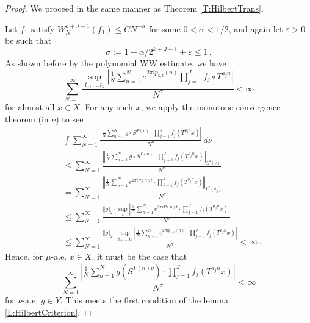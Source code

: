 \documentclass[11pt, oneside]{amsart}   	%
\newcommand{\ep}{\varepsilon}
\newcommand{\1}{\mathbbm{1}}
\theoremstyle{definition}
\begin{document}
\begin{proof}
We proceed in the same manner as Theorem \ref{T:HilbertTrans}.

Let $f_1$ satisfy $W^{k+J-1}_N(f_1) \leq CN^{-\alpha}$ for some $0<\alpha<1/2$, and again let $\ep > 0$ be such that 
$$\sigma := 1- \alpha/2^{k+J-1} + \ep \leq 1 \, .$$ 
As shown before by the polynomial WW estimate, we have 
$$\sum_{N=1}^\infty \frac{\sup_{t_1, \dots, t_k}\left|\frac{1}{N}\sum_{n=1}^N e^{2\pi i p_{k, t}(n)} \prod_{j=1}^{J} f_j \circ T^{a_j n}\right|}{N^\sigma} < \infty$$ for almost all $x\in X$. For any such $x$, we apply the monotone convergence theorem (in $\nu$) to see
\begin{align*}
&\int \sum_{N=1}^\infty \frac{\left| \frac{1}{N} \sum_{n=1}^N g \circ S^{P(n)} \cdot \prod_{j=1}^J f_j (T^{a_jn} x)\right|}{N^\sigma} \, d\nu \\
&\leq  \sum_{N=1}^\infty \frac{\left\Vert \frac{1}{N} \sum_{n=1}^N g \circ S^{P(n)} \cdot \prod_{j=1}^J f_j (T^{a_jn} x)\right\Vert_{L^2(\nu)}}{N^\sigma} \\
&= \sum_{N=1}^\infty \frac{\left\Vert \frac{1}{N} \sum_{n=1}^N e^{2\pi i P(n) t} \cdot \prod_{j=1}^J f_j (T^{a_jn} x)\right\Vert_{L^2(\sigma_g)}}{N^\sigma}  \\
&\leq \sum_{N=1}^\infty \frac{\Vert g\Vert_2 \cdot \sup_{t}\left| \frac{1}{N} \sum_{n=1}^N e^{2\pi i P(n) t} \cdot \prod_{j=1}^J f_j (T^{a_jn} x)\right|}{N^\sigma} \\
&\leq \sum_{N=1}^\infty \frac{\Vert g\Vert_2 \cdot \sup_{t_1, \dots, t_k}\left| \frac{1}{N} \sum_{n=1}^N e^{2\pi i p_{k, t}(n)} \cdot \prod_{j=1}^J f_j (T^{a_jn} x)\right|}{N^\sigma} <\infty \, .
\end{align*}
Hence, for $\mu$-a.e. $x\in X$, it must be the case that
$$\sum_{N=1}^\infty \frac{\left| \frac{1}{N} \sum_{n=1}^N g(S^{P(n)y}) \cdot \prod_{j=1}^J f_j (T^{a_jn} x)\right|}{N^\sigma} < \infty$$
for $\nu$-a.e. $y\in Y$. This meets the first condition of the lemma \ref{L:HilbertCriterion}.


\end{proof}
\end{document}
